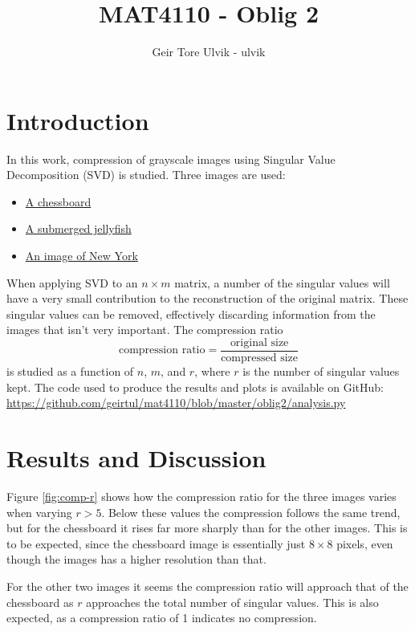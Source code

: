 \documentclass[12pt]{article}
\begin{document}
\title{MAT4110 - Oblig 2}
\author{Geir Tore Ulvik - ulvik}
\maketitle

\section{Introduction}
In this work, compression of grayscale images using Singular Value
Decomposition (SVD) is studied. Three images are used: 
\begin{itemize}
	\item \href{https://pixabay.com/en/board-chess-chessboard-black-white-157165/}{A chessboard}
	\item \href{https://pixabay.com/en/jellyfish-under-water-sea-ocean-698521/}{A submerged jellyfish}
	\item \href{https://pixabay.com/en/new-york-city-skyline-nyc-690868/}{An image of New York}
\end{itemize}
When applying SVD to an $n\times m$ matrix, a number of the singular values
will have a very small contribution to the reconstruction of the original
matrix. These singular values can be removed, effectively discarding 
information from the images that isn't very important.
The compression ratio
\begin{equation}
	\text{compression ratio} = \frac{\text{original size}}{\text{compressed size}}
\end{equation}
is studied as a function of $n$, $m$, and $r$, where $r$ is the number of
singular values kept.
The code used to produce the results and plots is available on GitHub:\\ 
\url{https://github.com/geirtul/mat4110/blob/master/oblig2/analysis.py}
\section{Results and Discussion}
Figure \ref{fig:comp-r} shows how the compression ratio for the three images
varies when varying $r > 5$. Below these values the compression follows the
same trend, but for the chessboard it rises far more sharply than for the
other images. This is to be expected, since the chessboard image is
essentially just $8\times 8$ pixels, even though the images has a higher
resolution than that.

For the other two images it seems the compression ratio will approach
that of the chessboard as $r$ approaches the total number of singular
values. This is also expected, as a compression ratio of 1 indicates
no compression.
\end{document}
